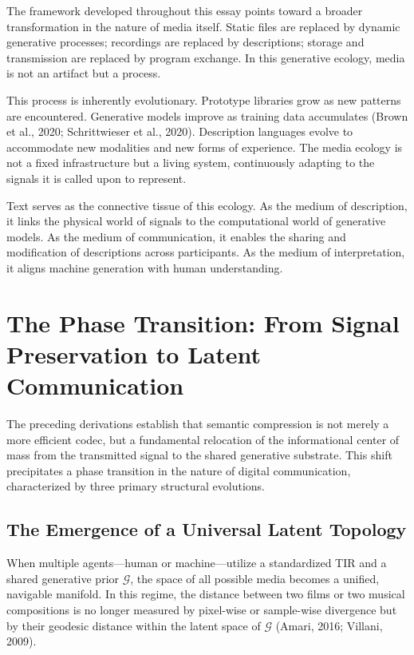 \documentclass[11pt,a4paper]{article}
\theoremstyle{definition}
\theoremstyle{remark}
\begin{document}
The framework developed throughout this essay points toward a broader transformation in the nature of media itself. Static files are replaced by dynamic generative processes; recordings are replaced by descriptions; storage and transmission are replaced by program exchange. In this generative ecology, media is not an artifact but a process.

This process is inherently evolutionary. Prototype libraries grow as new patterns are encountered. Generative models improve as training data accumulates (Brown et al., 2020; Schrittwieser et al., 2020). Description languages evolve to accommodate new modalities and new forms of experience. The media ecology is not a fixed infrastructure but a living system, continuously adapting to the signals it is called upon to represent.

Text serves as the connective tissue of this ecology. As the medium of description, it links the physical world of signals to the computational world of generative models. As the medium of communication, it enables the sharing and modification of descriptions across participants. As the medium of interpretation, it aligns machine generation with human understanding.

\section{The Phase Transition: From Signal Preservation to Latent Communication}
\label{sec:phase_transition}

The preceding derivations establish that semantic compression is not merely a more efficient codec, but a fundamental relocation of the informational center of mass from the transmitted signal to the shared generative substrate. This shift precipitates a phase transition in the nature of digital communication, characterized by three primary structural evolutions.

\subsection{The Emergence of a Universal Latent Topology}

When multiple agents---human or machine---utilize a standardized TIR and a shared generative prior $\mathcal{G}$, the space of all possible media becomes a unified, navigable manifold. In this regime, the distance between two films or two musical compositions is no longer measured by pixel-wise or sample-wise divergence but by their geodesic distance within the latent space of $\mathcal{G}$ (Amari, 2016; Villani, 2009).
\end{document}
